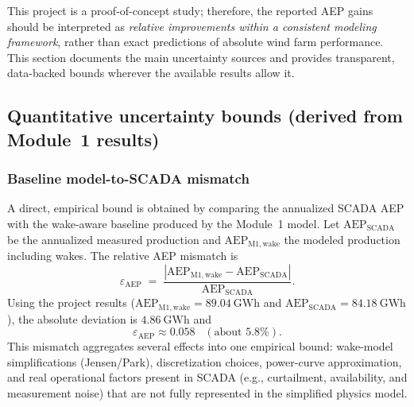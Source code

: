 \documentclass[lettersize,journal]{IEEEtran}
\begin{document}
This project is a proof-of-concept study; therefore, the reported AEP gains should be interpreted as \emph{relative improvements within a consistent modeling framework}, rather than exact predictions of absolute wind farm performance. This section documents the main uncertainty sources and provides transparent, data-backed bounds wherever the available results allow it.

\subsection{Quantitative uncertainty bounds (derived from Module~1 results)}
\label{subsec:error_quant}

\subsubsection{Baseline model-to-SCADA mismatch}
A direct, empirical bound is obtained by comparing the annualized SCADA AEP with the wake-aware baseline produced by the Module~1 model. Let $\mathrm{AEP}_{\mathrm{SCADA}}$ be the annualized measured production and $\mathrm{AEP}_{\mathrm{M1,wake}}$ the modeled production including wakes. The relative AEP mismatch is
\begin{equation}
\varepsilon_{\mathrm{AEP}} \;=\;
\frac{\left|\mathrm{AEP}_{\mathrm{M1,wake}}-\mathrm{AEP}_{\mathrm{SCADA}}\right|}{\mathrm{AEP}_{\mathrm{SCADA}}}.
\label{eq:err_aep_mismatch}
\end{equation}
Using the project results ($\mathrm{AEP}_{\mathrm{M1,wake}}=89.04~\mathrm{GWh}$ and $\mathrm{AEP}_{\mathrm{SCADA}}=84.18~\mathrm{GWh}$), the absolute deviation is $4.86~\mathrm{GWh}$ and
\begin{equation}
\varepsilon_{\mathrm{AEP}} \approx 0.058 \;\;\;(\text{about }5.8\%).
\label{eq:err_aep_value}
\end{equation}
This mismatch aggregates several effects into one empirical bound: wake-model simplifications (Jensen/Park), discretization choices, power-curve approximation, and real operational factors present in SCADA (e.g., curtailment, availability, and measurement noise) that are not fully represented in the simplified physics model.
\end{document}
